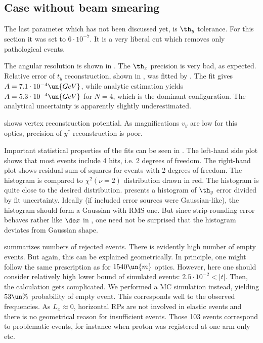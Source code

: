 \subsection{Case without beam smearing}

The last parameter which has not been discussed yet, is $\th_y$ tolerance. For this section it was set to $6\cdot10^{-7}$. It is a very liberal cut which removes only pathological events.


\break\hbox{}
\kern-1.6cm

The angular resolution is shown in . The $\th_x$ precision is very bad, as expected. Relative error of $t_y$ reconstruction, shown in , was fitted by . The fit gives $A = 7.1\cdot10^{-4}\un{GeV}$, while analytic estimation yields $A = 5.3\cdot10^{-4}\un{GeV}$ for $N = 4$, which is the dominant configuration. The analytical uncertainty is apparently slightly underestimated.

 shows vertex reconstruction potential. As magnifications $v_y$ are low for this optics, precision of $y^*$ reconstruction is poor.

Important statistical properties of the fits can be seen in . The left-hand side plot shows that most events include 4 hits, i.e. 2 degrees of freedom. The right-hand plot shows residual sum of squares for events with 2 degrees of freedom. The histogram is compared to $\chi^2(\nu = 2)$ distribution drawn in red. The histogram is quite close to the desired distribution.  presents a histogram of $\th_y$ error divided by fit uncertainty. Ideally (if included error sources were Gaussian-like), the histogram should form a Gaussian with RMS one. But since strip-rounding error behaves rather like $\de x$ in , one need not be surprised that the histogram deviates from Gaussian shape.

 summarizes numbers of rejected events. There is evidently high number of empty events. But again, this can be explained geometrically. In principle, one might follow the same prescription as for $1540\un{m}$ optics. However, here one should consider relatively high lower bound of simulated events: $2.5\cdot10^{-2} < |t|$. Then, the calculation gets complicated. We performed a MC simulation instead, yielding $53\un{\%}$ probability of empty event. This corresponds well to the observed frequencies. As $L_x\approx 0$, horizontal RPs are not involved in elastic events and there is no geometrical reason for insufficient events. Those 103 events correspond to problematic events, for instance when proton was registered at one arm only etc.

